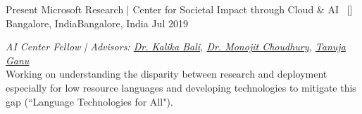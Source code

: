 
\begin{experiences}

\researchexperience
    {Present}   {Microsoft Research | Center for Societal Impact through Cloud \& AI{\normalfont  ~ [\href{https://www.microsoft.com/en-us/research/collaboration/scai/}{\small{\websiteSymbol}}]
    }}{Bangalore, India}{Bangalore, India}
    {Jul 2019} {\textit{AI Center Fellow | Advisors:  \href{https://www.microsoft.com/en-us/research/people/kalikab/}{Dr. Kalika Bali}, \href{https://www.microsoft.com/en-us/research/people/monojitc/}{Dr. Monojit Choudhury}, \href{https://www.microsoft.com/en-us/research/people/taganu/}{Tanuja Ganu}}\\
    Working on understanding the disparity between research and deployment especially for low resource languages and developing technologies to mitigate this gap (``Language Technologies for All").
    \vskip 0.1cm

}
\end{experiences}

